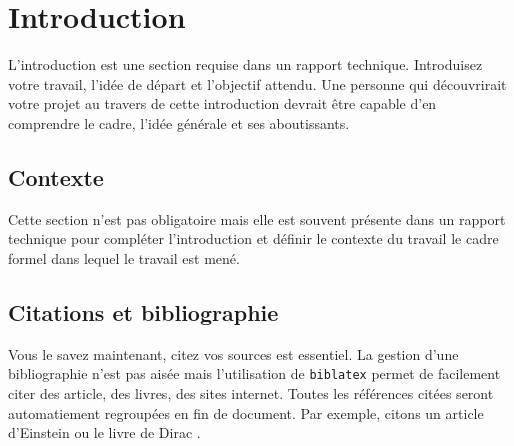 \documentclass[
    iai, %
    eai  %
]{heig-tb}
\begin{document}
\maketitle
\frontmatter
\clearemptydoublepage

\preamble
\authentification

\begin{abstract}

\end{abstract}

\clearemptydoublepage
{
    \tableofcontents
    \let\cleardoublepage\clearpage
    \listoffigures
    \let\cleardoublepage\clearpage
    \listoftables
    \let\cleardoublepage\clearpage
    \listoflistings
}

\printnomenclature
\clearemptydoublepage
{}

\mainmatter
\chapter{Introduction}

L'introduction est une section requise dans un rapport technique. Introduisez votre travail, l'idée de départ et l'objectif attendu. Une personne qui découvrirait votre projet au travers de cette introduction devrait être capable d'en comprendre le cadre, l'idée générale et ses aboutissants.

\section{Contexte}

Cette section n'est pas obligatoire mais elle est souvent présente dans un rapport technique pour compléter l'introduction et définir le contexte du travail \cad le cadre formel dans lequel le travail est mené.

\section{Citations et bibliographie}

Vous le savez maintenant, citez vos sources est essentiel. La gestion d'une bibliographie n'est pas aisée mais l'utilisation de \texttt{biblatex} permet de facilement citer des article, des livres, des sites internet. Toutes les références citées seront automatiement regroupées en fin de document. Par exemple, citons un article d'Einstein \cite{einstein} ou le livre de Dirac \cite{dirac}.
\end{document}
